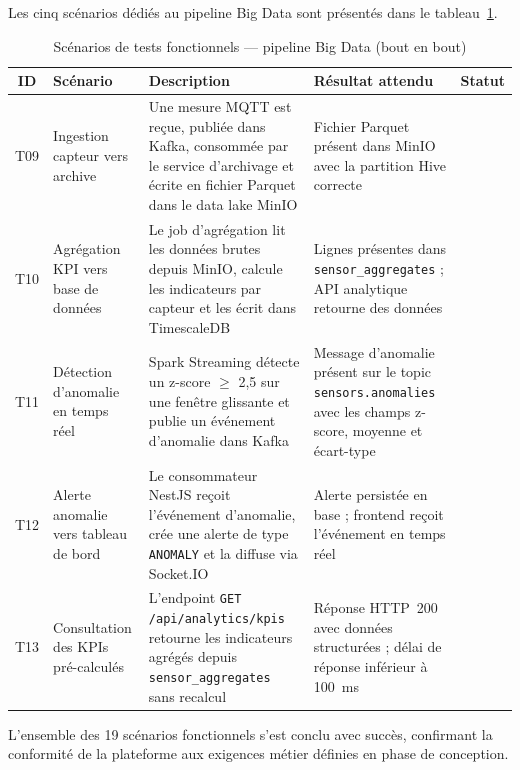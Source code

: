Les cinq scénarios dédiés au pipeline Big Data sont présentés dans le
tableau~\ref{tab:tests_bigdata}.

\begin{table}[H]
	\centering
	\renewcommand{\arraystretch}{1.4}
	\caption{Scénarios de tests fonctionnels — pipeline Big Data (bout en bout)}
	\begin{tabular}{|c|p{3.5cm}|p{5.5cm}|p{2.5cm}|c|}
		\hline
		\textbf{ID} & \textbf{Scénario} & \textbf{Description} & \textbf{Résultat attendu} & \textbf{Statut} \\
		\hline
		T09
		& Ingestion capteur vers archive
		& Une mesure MQTT est reçue, publiée dans Kafka, consommée
		par le service d'archivage et écrite en fichier Parquet
		dans le data lake MinIO
		& Fichier Parquet présent dans MinIO avec la partition
		Hive correcte
		& \textbf{\checkmark} \\
		\hline
		T10
		& Agrégation KPI vers base de données
		& Le job d'agrégation lit les données brutes depuis MinIO,
		calcule les indicateurs par capteur et les écrit
		dans TimescaleDB
		& Lignes présentes dans \texttt{sensor\_aggregates} ;
		API analytique retourne des données
		& \textbf{\checkmark} \\
		\hline
		T11
		& Détection d'anomalie en temps réel
		& Spark Streaming détecte un z-score $\geq$ 2,5 sur une
		fenêtre glissante et publie un événement d'anomalie
		dans Kafka
		& Message d'anomalie présent sur le topic
		\texttt{sensors.anomalies} avec les champs
		z-score, moyenne et écart-type
		& \textbf{\checkmark} \\
		\hline
		T12
		& Alerte anomalie vers tableau de bord
		& Le consommateur NestJS reçoit l'événement d'anomalie,
		crée une alerte de type \texttt{ANOMALY} et la diffuse
		via Socket.IO
		& Alerte persistée en base ; frontend reçoit
		l'événement en temps réel
		& \textbf{\checkmark} \\
		\hline
		T13
		& Consultation des KPIs pré-calculés
		& L'endpoint \texttt{GET /api/analytics/kpis} retourne
		les indicateurs agrégés depuis \texttt{sensor\_aggregates}
		sans recalcul
		& Réponse HTTP~200 avec données structurées ;
		délai de réponse inférieur à 100~ms
		& \textbf{\checkmark} \\
		\hline
	\end{tabular}
	\label{tab:tests_bigdata}
\end{table}

L'ensemble des 19 scénarios fonctionnels s'est conclu avec succès, confirmant la
conformité de la plateforme aux exigences métier définies en phase de conception.


